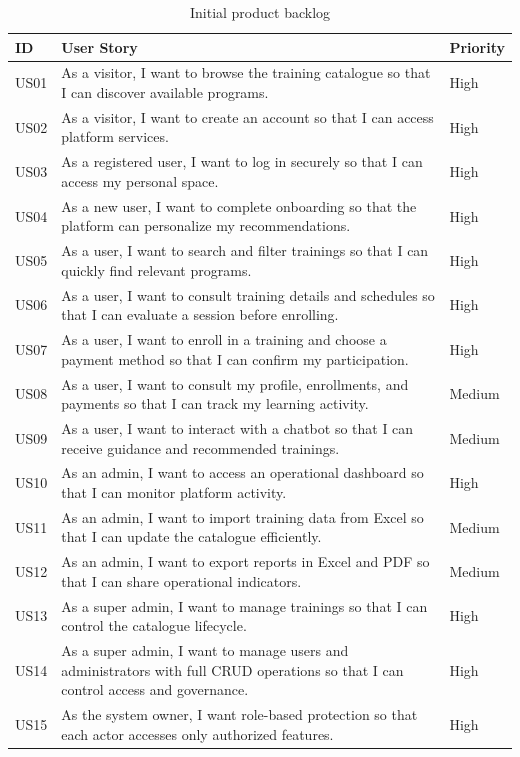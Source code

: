 \renewcommand{\arraystretch}{1.2}
\begin{table}[htbp]
\centering
\small
\begin{tabular}{|p{1.2cm}|p{9.3cm}|p{2cm}|}
\hline
\textbf{ID} & \textbf{User Story} & \textbf{Priority} \\
\hline
US01 & As a visitor, I want to browse the training catalogue so that I can discover available programs. & High \\
\hline
US02 & As a visitor, I want to create an account so that I can access platform services. & High \\
\hline
US03 & As a registered user, I want to log in securely so that I can access my personal space. & High \\
\hline
US04 & As a new user, I want to complete onboarding so that the platform can personalize my recommendations. & High \\
\hline
US05 & As a user, I want to search and filter trainings so that I can quickly find relevant programs. & High \\
\hline
US06 & As a user, I want to consult training details and schedules so that I can evaluate a session before enrolling. & High \\
\hline
US07 & As a user, I want to enroll in a training and choose a payment method so that I can confirm my participation. & High \\
\hline
US08 & As a user, I want to consult my profile, enrollments, and payments so that I can track my learning activity. & Medium \\
\hline
US09 & As a user, I want to interact with a chatbot so that I can receive guidance and recommended trainings. & Medium \\
\hline
US10 & As an admin, I want to access an operational dashboard so that I can monitor platform activity. & High \\
\hline
US11 & As an admin, I want to import training data from Excel so that I can update the catalogue efficiently. & Medium \\
\hline
US12 & As an admin, I want to export reports in Excel and PDF so that I can share operational indicators. & Medium \\
\hline
US13 & As a super admin, I want to manage trainings so that I can control the catalogue lifecycle. & High \\
\hline
US14 & As a super admin, I want to manage users and administrators with full CRUD operations so that I can control access and governance. & High \\
\hline
US15 & As the system owner, I want role-based protection so that each actor accesses only authorized features. & High \\
\hline
\end{tabular}
\caption{Initial product backlog}
\label{tab:product-backlog}
\end{table}

